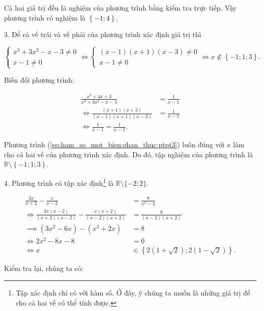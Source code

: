 Cả hai giá trị đều là nghiệm của phương trình bằng kiểm tra trực tiếp. Vậy phương trình có nghiệm là $\left\{-1; 4\right\}$.

3. Để cả vế trái và vế phải của phương trình xác định giá trị thì

\begin{equation*}
   \begin{cases}
      x^3 + 3x^2 - x - 3 \neq 0 \\
      x - 1 \neq 0
   \end{cases} \iff 
   \begin{cases}
      (x - 1)(x + 1)(x - 3) \neq 0 \\
      x - 1 \neq 0
   \end{cases}
   \iff x \notin \left\{-1; 1; 3\right\}.
\end{equation*}

Biến đổi phương trình:

\begin{align}
   \frac{x^2 + 4x + 3}{x^3 + 3x^2 -x - 3} &= \frac{1}{x - 1} \nonumber\\
   \iff \frac{(x + 1)(x + 3)}{(x - 1)(x + 1)(x - 3)} &= \frac{1}{x - 1} \nonumber\\
   \iff \frac{1}{x - 1} = \frac{1}{x - 1}. \label{eq:ham_so_mot_bien:ơhan_thuc:ptpt3}
\end{align}

Phương trình (\ref{eq:ham_so_mot_bien:ơhan_thuc:ptpt3}) luôn đúng với $x$ làm cho cả hai vế của phương trình xác định. Do đó, tập nghiệm của phương trình là $\mathbb{R} \setminus \left\{-1; 1; 3\right\}$.

4. Phương trình có tập xác định\footnote{Tập xác định chỉ có với hàm số. Ở đây, ý chúng ta muốn là những giá trị để cho cả hai vế có thể tính được.} là $\mathbb{R} \setminus \{-2; 2\}$.

\begin{align*}
   \frac{3x}{x + 2} - \frac{x}{x - 2} &= \frac{8}{x^2 - 4} \\
   \iff \frac{3x(x - 2)}{(x + 2)(x - 2)} - \frac{x(x + 2)}{(x - 2)(x + 2)} &= \frac{8}{(x - 2)(x + 2)} \\
   \implies \left(3x^2 - 6x\right) - \left(x^2 + 2x\right) &= 8 \\
   \iff 2x^2 - 8x - 8 &= 0 \\
   \iff x &\in \left\{2\left(1 + \sqrt{2}\right); 2(1 - \sqrt{2})\right\}.
\end{align*}

Kiểm tra lại, chúng ta có:

